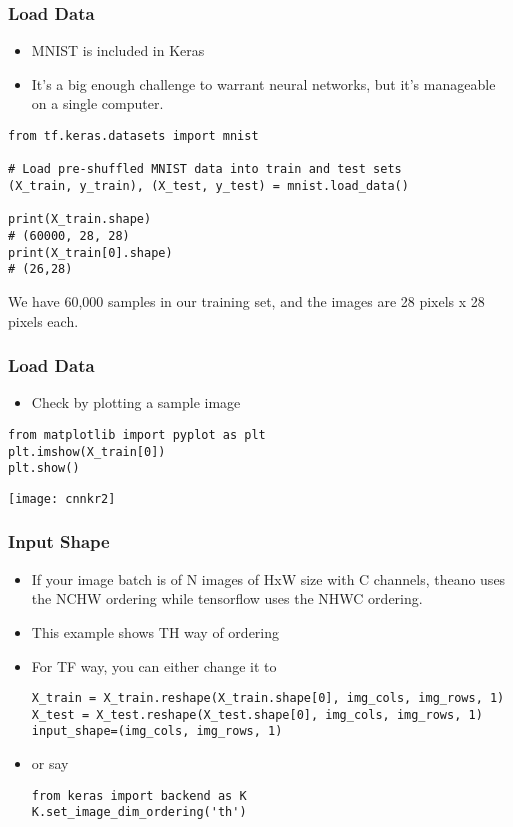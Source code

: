 \begin{frame}[fragile] \frametitle{Load Data}

\begin{itemize}
\item MNIST is included in Keras
\item It's a big enough challenge to warrant neural networks, but it's manageable on a single computer. 
\end{itemize}
\begin{lstlisting}
from tf.keras.datasets import mnist
 
# Load pre-shuffled MNIST data into train and test sets
(X_train, y_train), (X_test, y_test) = mnist.load_data()

print(X_train.shape)
# (60000, 28, 28)
print(X_train[0].shape)
# (26,28)
\end{lstlisting}
We have 60,000 samples in our training set, and the images are 28 pixels x 28 pixels each.
\end{frame}

\begin{frame}[fragile] \frametitle{Load Data}

\begin{itemize}
\item Check by plotting a sample image
\end{itemize}
\begin{lstlisting}
from matplotlib import pyplot as plt
plt.imshow(X_train[0])
plt.show()
\end{lstlisting}
\begin{center}
\texttt{[image: cnnkr2]}
\end{center}
\end{frame}

\begin{frame}[fragile] \frametitle{Input Shape}

\begin{itemize}
\item If your image batch is of N images of HxW size with C channels, theano uses the NCHW ordering while tensorflow uses the NHWC ordering.
\item This example shows TH way of ordering
\item For TF way, you can either change it to 
\begin{lstlisting}
X_train = X_train.reshape(X_train.shape[0], img_cols, img_rows, 1)
X_test = X_test.reshape(X_test.shape[0], img_cols, img_rows, 1)
input_shape=(img_cols, img_rows, 1)
\end{lstlisting}
\item or say
\begin{lstlisting}
from keras import backend as K
K.set_image_dim_ordering('th')
\end{lstlisting}
\end{itemize}
\end{frame}



